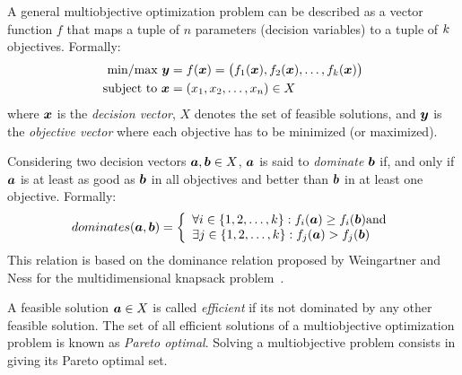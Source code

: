 A general multiobjective optimization problem can be described as a vector
function $f$ that maps a tuple of $n$ parameters (decision variables) to a tuple
of $k$ objectives.
Formally:
\begin{align*}
  \text{min/max} ~ \boldsymbol{y} &= f(\boldsymbol{x}) = 
    \big(f_1(\boldsymbol{x})
    ,f_2(\boldsymbol{x})
    ,\ldots
    ,f_{k}(\boldsymbol{x})\big) \\
  \text{subject to} ~ \boldsymbol{x} & = (x_1, x_2, \ldots, x_n) \in X
\end{align*}
where $\boldsymbol{x}$ is the \emph{decision vector}, $X$ denotes the set
of feasible solutions, and $\boldsymbol{y}$ is the \emph{objective vector} where
each objective has to be minimized (or maximized).

Considering two decision vectors $\boldsymbol{a}, \boldsymbol{b} \in X$, $\boldsymbol{a}$ is said to
\emph{dominate} $\boldsymbol{b}$ if, and only if $\boldsymbol{a}$ is at least as good as $\boldsymbol{b}$
in all objectives and better than $\boldsymbol{b}$ in at least one objective.
Formally:
\begin{displaymath}
    dominates(\boldsymbol{a}, \boldsymbol{b}) = \left\{
      \begin{array}{l}
          \forall i \in \{1, 2, \ldots, k\}: f_i(\boldsymbol{a}) \geq f_i(\boldsymbol{b}) \text{and}\\
          \exists j \in \{1, 2, \ldots, k\}: f_j(\boldsymbol{a}) > f_j(\boldsymbol{b})
  \end{array} \right.
\end{displaymath}
This relation is based on the dominance relation proposed by Weingartner and
Ness for the multidimensional knapsack problem~\cite{weingartner1967methods}.

A feasible solution $\boldsymbol{a} \in X$ is called \emph{efficient} %
if its not dominated by any other feasible solution.
The set of all efficient solutions of a multiobjective optimization problem is
known as \emph{Pareto optimal}.
Solving a multiobjective problem consists in giving its Pareto optimal set.

